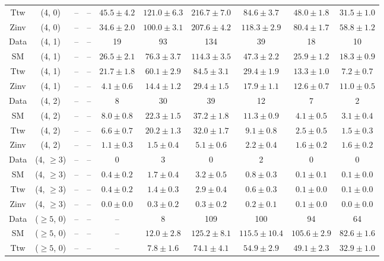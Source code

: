 \begin{table}[h!]
{\begin{tabular}{cccccccccc}
	Ttw & (4, 0) & -- & -- & $45.5\pm 4.2$ & $121.0\pm 6.3$ & $216.7\pm 7.0$ & $84.6\pm 3.7$ & $48.0\pm 1.8$ & $31.5\pm 1.0$ \\[0.5ex] 
	Zinv & (4, 0) & -- & -- & $34.6\pm 2.0$ & $100.0\pm 3.1$ & $207.6\pm 4.2$ & $118.3\pm 2.9$ & $80.4\pm 1.7$ & $58.8\pm 1.2$ \\[0.5ex] 
	Data & (4, 1) & -- & -- & 19 & 93 & 134 & 39 & 18 & 10 \\[0.5ex] 
	SM & (4, 1) & -- & -- & $26.5\pm 2.1$ & $76.3\pm 3.7$ & $114.3\pm 3.5$ & $47.3\pm 2.2$ & $25.9\pm 1.2$ & $18.3\pm 0.9$ \\[0.5ex] 
	Ttw & (4, 1) & -- & -- & $21.7\pm 1.8$ & $60.1\pm 2.9$ & $84.5\pm 3.1$ & $29.4\pm 1.9$ & $13.3\pm 1.0$ & $7.2\pm 0.7$ \\[0.5ex] 
	Zinv & (4, 1) & -- & -- & $4.1\pm 0.6$ & $14.4\pm 1.2$ & $29.4\pm 1.5$ & $17.9\pm 1.1$ & $12.6\pm 0.7$ & $11.0\pm 0.5$ \\[0.5ex] 
	Data & (4, 2) & -- & -- & 8 & 30 & 39 & 12 & 7 & 2 \\[0.5ex] 
	SM & (4, 2) & -- & -- & $8.0\pm 0.8$ & $22.3\pm 1.5$ & $37.2\pm 1.8$ & $11.3\pm 0.9$ & $4.1\pm 0.5$ & $3.1\pm 0.4$ \\[0.5ex] 
	Ttw & (4, 2) & -- & -- & $6.6\pm 0.7$ & $20.2\pm 1.3$ & $32.0\pm 1.7$ & $9.1\pm 0.8$ & $2.5\pm 0.5$ & $1.5\pm 0.3$ \\[0.5ex] 
	Zinv & (4, 2) & -- & -- & $1.1\pm 0.3$ & $1.5\pm 0.4$ & $5.1\pm 0.6$ & $2.2\pm 0.4$ & $1.6\pm 0.2$ & $1.6\pm 0.2$ \\[0.5ex] 
	Data & (4, $\ge3$) & -- & -- & 0 & 3 & 0 & 2 & 0 & 0 \\[0.5ex] 
	SM & (4, $\ge3$) & -- & -- & $0.4\pm 0.2$ & $1.7\pm 0.4$ & $3.2\pm 0.5$ & $0.8\pm 0.3$ & $0.1\pm 0.1$ & $0.1\pm 0.0$ \\[0.5ex] 
	Ttw & (4, $\ge3$) & -- & -- & $0.4\pm 0.2$ & $1.4\pm 0.3$ & $2.9\pm 0.4$ & $0.6\pm 0.3$ & $0.1\pm 0.0$ & $0.1\pm 0.0$ \\[0.5ex] 
	Zinv & (4, $\ge3$) & -- & -- & $0.0\pm 0.0$ & $0.3\pm 0.2$ & $0.3\pm 0.2$ & $0.2\pm 0.1$ & $0.1\pm 0.0$ & $0.0\pm 0.0$ \\[0.5ex] 
	Data & ($\ge5$, 0) & -- & -- & -- & 8 & 109 & 100 & 94 & 64 \\[0.5ex] 
	SM & ($\ge5$, 0) & -- & -- & -- & $12.0\pm 2.8$ & $125.2\pm 8.1$ & $115.5\pm 10.4$ & $105.6\pm 2.9$ & $82.6\pm 1.6$ \\[0.5ex] 
	Ttw & ($\ge5$, 0) & -- & -- & -- & $7.8\pm 1.6$ & $74.1\pm 4.1$ & $54.9\pm 2.9$ & $49.1\pm 2.3$ & $32.9\pm 1.0$ \\[0.5ex] 

\end{tabular}}
\end{table}
